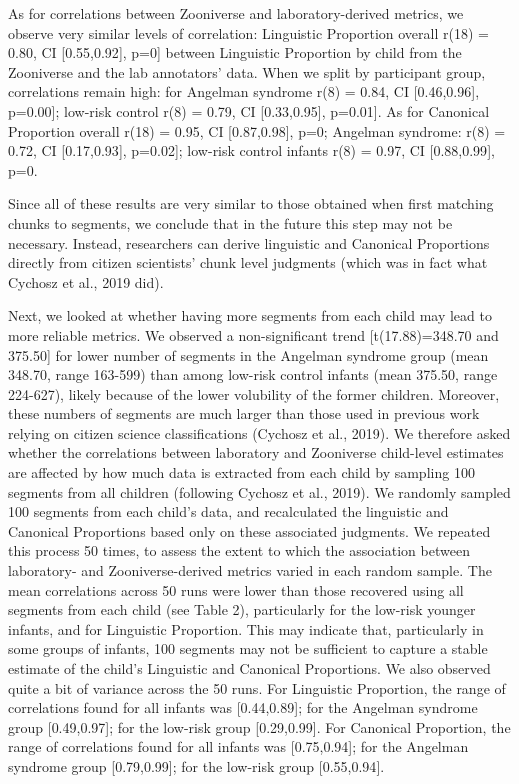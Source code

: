 \documentclass[english,,man]{apa6}
\begin{document}
As for correlations between Zooniverse and laboratory-derived metrics, we observe very similar levels of correlation: Linguistic Proportion overall r(18) = 0.80, CI {[}0.55,0.92{]}, p=0{]} between Linguistic Proportion by child from the Zooniverse and the lab annotators' data. When we split by participant group, correlations remain high: for Angelman syndrome r(8) = 0.84, CI {[}0.46,0.96{]}, p=0.00{]}; low-risk control r(8) = 0.79, CI {[}0.33,0.95{]}, p=0.01{]}. As for Canonical Proportion overall r(18) = 0.95, CI {[}0.87,0.98{]}, p=0; Angelman syndrome: r(8) = 0.72, CI {[}0.17,0.93{]}, p=0.02{]}; low-risk control infants r(8) = 0.97, CI {[}0.88,0.99{]}, p=0.

Since all of these results are very similar to those obtained when first matching chunks to segments, we conclude that in the future this step may not be necessary. Instead, researchers can derive linguistic and Canonical Proportions directly from citizen scientists' chunk level judgments (which was in fact what Cychosz et al., 2019 did).

Next, we looked at whether having more segments from each child may lead to more reliable metrics. We observed a non-significant trend {[}t(17.88)=348.70 and 375.50{]} for lower number of segments in the Angelman syndrome group (mean 348.70, range 163-599) than among low-risk control infants (mean 375.50, range 224-627), likely because of the lower volubility of the former children. Moreover, these numbers of segments are much larger than those used in previous work relying on citizen science classifications (Cychosz et al., 2019). We therefore asked whether the correlations between laboratory and Zooniverse child-level estimates are affected by how much data is extracted from each child by sampling 100 segments from all children (following Cychosz et al., 2019). We randomly sampled 100 segments from each child's data, and recalculated the linguistic and Canonical Proportions based only on these associated judgments. We repeated this process 50 times, to assess the extent to which the association between laboratory- and Zooniverse-derived metrics varied in each random sample. The mean correlations across 50 runs were lower than those recovered using all segments from each child (see Table 2), particularly for the low-risk younger infants, and for Linguistic Proportion. This may indicate that, particularly in some groups of infants, 100 segments may not be sufficient to capture a stable estimate of the child's Linguistic and Canonical Proportions. We also observed quite a bit of variance across the 50 runs. For Linguistic Proportion, the range of correlations found for all infants was {[}0.44,0.89{]}; for the Angelman syndrome group {[}0.49,0.97{]}; for the low-risk group {[}0.29,0.99{]}. For Canonical Proportion, the range of correlations found for all infants was {[}0.75,0.94{]}; for the Angelman syndrome group {[}0.79,0.99{]}; for the low-risk group {[}0.55,0.94{]}.
\end{document}
